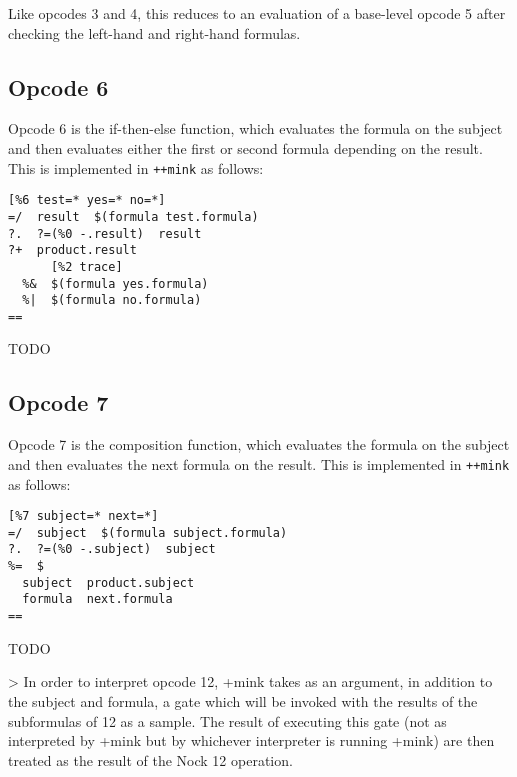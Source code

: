 \documentclass[twoside]{article}
\begin{document}
\noindent
Like opcodes 3 and 4, this reduces to an evaluation of a base-level opcode 5 after checking the left-hand and right-hand formulas.

\subsection{Opcode 6}

Opcode 6 is the if-then-else function, which evaluates the formula on the subject and then evaluates either the first or second formula depending on the result.  This is implemented in \lstinline[style=inlinecode]{++mink} as follows:

\begin{lstlisting}[style=listingcode]
  [%6 test=* yes=* no=*]
=/  result  $(formula test.formula)
?.  ?=(%0 -.result)  result
?+  product.result
      [%2 trace]
  %&  $(formula yes.formula)
  %|  $(formula no.formula)
==
\end{lstlisting}

\noindent
TODO

\subsection{Opcode 7}

Opcode 7 is the composition function, which evaluates the formula on the subject and then evaluates the next formula on the result.  This is implemented in \lstinline[style=inlinecode]{++mink} as follows:

\begin{lstlisting}[style=listingcode]
  [%7 subject=* next=*]
=/  subject  $(formula subject.formula)
?.  ?=(%0 -.subject)  subject
%=  $
  subject  product.subject
  formula  next.formula
==
\end{lstlisting}

\noindent
TODO

> In order to interpret opcode 12, +mink takes as an argument, in addition to the subject and formula, a gate which will be invoked with the results of the subformulas of 12 as a sample. The result of executing this gate (not as interpreted by +mink but by whichever interpreter is running +mink) are then treated as the result of the Nock 12 operation.
\end{document}
